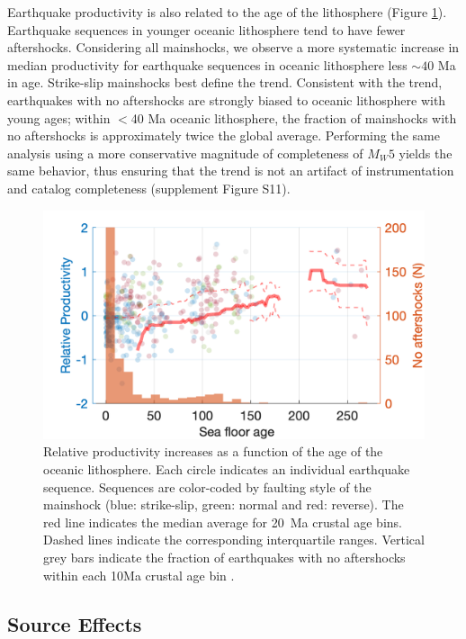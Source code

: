 \documentclass[draft, jgrga]{agujournal2018}
\begin{document}
    Earthquake productivity is also related to the age of the lithosphere  (Figure \ref{fig:prod_vs_age}). Earthquake sequences in younger oceanic lithosphere tend to have fewer aftershocks. Considering all mainshocks, we observe a more systematic increase in median productivity for earthquake sequences in oceanic lithosphere less $\sim 40$ Ma in age. Strike-slip mainshocks best define the trend. Consistent with the trend, earthquakes with no aftershocks are strongly biased to oceanic lithosphere with young ages; within $<$40 Ma oceanic lithosphere, the fraction of mainshocks with no aftershocks is approximately twice the global average. Performing the same analysis using a more conservative magnitude of completeness of $M_W5$ yields the same behavior, thus ensuring that the trend is not an artifact of instrumentation and catalog completeness (supplement Figure S11).

    \begin{figure}
        \centering
        \includegraphics{prod_vs_age.png}
        \caption{Relative productivity increases as a function of the age of the oceanic lithosphere. Each circle indicates an individual earthquake sequence. Sequences are color-coded by faulting style of the mainshock (blue: strike-slip, green: normal and red: reverse). The red line indicates the median average for 20~Ma crustal age bins. Dashed lines indicate the corresponding interquartile ranges. Vertical grey bars indicate the fraction of earthquakes with no aftershocks within each 10Ma crustal age bin .}
        \label{fig:prod_vs_age}
    \end{figure}

    \subsection{Source Effects}\label{sec:source_parameters}
\end{document}
